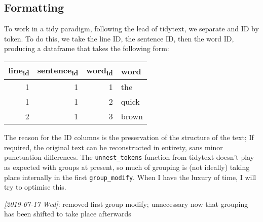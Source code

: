 \documentclass[a4paper, 11pt]{article}
\begin{document}
\subsection{Formatting}
\label{sec:org7e6b6ee}
To work in a tidy paradigm, following the lead of tidytext, we
separate and ID by token. To do this, we take the line ID, the
sentence ID, then the word ID, producing a dataframe that takes the
following form:

\begin{center}
\begin{tabular}{rrrl}
line\textsubscript{id} & sentence\textsubscript{id} & word\textsubscript{id} & word\\
\hline
1 & 1 & 1 & the\\
1 & 1 & 2 & quick\\
2 & 1 & 3 & brown\\
\end{tabular}
\end{center}

The reason for the ID columns is the preservation of the structure of
the text; If required, the original text can be reconstructed in
entirety, sans minor punctuation differences. The \texttt{unnest\_tokens}
function from tidytext doesn't play as expected with groups at
present, so much of grouping is (not ideally) taking place internally
in the first \texttt{group\_modify}. When I have the luxury of time, I will
try to optimise this.

\textit{[2019-07-17 Wed]}: removed first group modify; unnecessary now that
grouping has been shifted to take place afterwards
\end{document}
